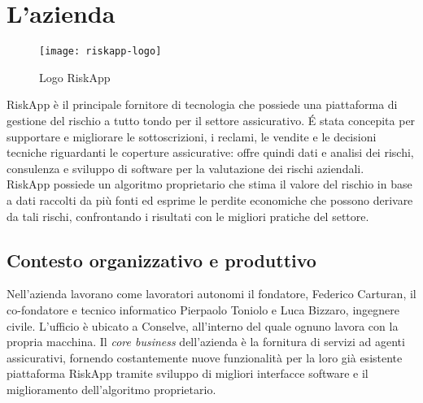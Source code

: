 
\chapter{L'azienda}
\begin{figure}[H] 
    \centering
    \texttt{[image: riskapp-logo]} 
    \caption{Logo RiskApp}
    \label{img:riskapp-logo}
\end{figure}
RiskApp è il principale fornitore di tecnologia che possiede una piattaforma di gestione del rischio a tutto tondo per il settore assicurativo. \'E stata concepita per supportare e migliorare le sottoscrizioni, i reclami, le vendite e le decisioni tecniche riguardanti le coperture assicurative: offre quindi dati e analisi dei rischi, consulenza e sviluppo di software per la valutazione dei rischi aziendali.
\medskip
\\RiskApp possiede un algoritmo proprietario che stima il valore del rischio in base a dati raccolti da più fonti ed esprime le perdite economiche che possono derivare da tali rischi, confrontando i risultati con le migliori pratiche del settore. 

\section{Contesto organizzativo e produttivo}
Nell'azienda lavorano come lavoratori autonomi il fondatore, Federico Carturan, il co-fondatore e tecnico informatico Pierpaolo Toniolo e Luca Bizzaro, ingegnere civile. L'ufficio è ubicato a Conselve, all'interno del quale ognuno lavora con la propria macchina. Il \textit{core business} dell'azienda è la fornitura di servizi ad agenti assicurativi, fornendo costantemente nuove funzionalità per la loro già esistente piattaforma RiskApp tramite sviluppo di migliori interfacce software e il miglioramento dell'algoritmo proprietario.

